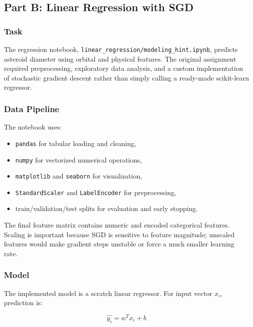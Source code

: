 \documentclass[11pt,a4paper]{article}
\newcommand{\code}[1]{\texttt{#1}}
\begin{document}
\subsection{Part B: Linear Regression with SGD}

\subsubsection{Task}

The regression notebook, \code{linear\_regression/modeling\_hint.ipynb}, predicts asteroid diameter using orbital and physical features. The original assignment required preprocessing, exploratory data analysis, and a custom implementation of stochastic gradient descent rather than simply calling a ready-made scikit-learn regressor.

\subsubsection{Data Pipeline}

The notebook uses:

\begin{itemize}[leftmargin=*]
    \item \code{pandas} for tabular loading and cleaning,
    \item \code{numpy} for vectorized numerical operations,
    \item \code{matplotlib} and \code{seaborn} for visualization,
    \item \code{StandardScaler} and \code{LabelEncoder} for preprocessing,
    \item train/validation/test splits for evaluation and early stopping.
\end{itemize}

The final feature matrix contains numeric and encoded categorical features. Scaling is important because SGD is sensitive to feature magnitude; unscaled features would make gradient steps unstable or force a much smaller learning rate.

\subsubsection{Model}

The implemented model is a scratch linear regressor. For input vector \(x_i\), prediction is:

\begin{equation}
    \hat{y_i} = w^T x_i + b
\end{equation}
\end{document}
